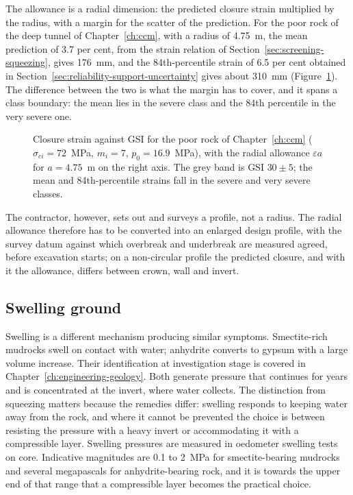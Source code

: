 The allowance is a radial dimension: the predicted closure strain multiplied
by the radius, with a margin for the scatter of the prediction. For the poor
rock of the deep tunnel of Chapter~\ref{ch:ccm}, with a radius of 4.75~m,
the mean prediction of 3.7 per cent, from the strain relation of
Section~\ref{sec:screening-squeezing}, gives 176~mm, and the 84th-percentile
strain of 6.5 per cent obtained in
Section~\ref{sec:reliability-support-uncertainty} gives about 310~mm
(Figure~\ref{fig:squeezing-allowance}). The
difference between the two is what the margin has to cover,
and it spans a class boundary: the mean lies in the severe class and the
84th percentile in the very severe one.

\begin{figure}[htbp]
\centering
{}
\caption{Closure strain against GSI for the poor rock of Chapter~\ref{ch:ccm} ($\sigma_{ci} = 72$~MPa, $m_i = 7$, $p_0 = 16.9$~MPa), with the radial allowance $\varepsilon a$ for $a = 4.75$~m on the right axis. The grey band is GSI $30 \pm 5$; the mean and 84th-percentile strains fall in the severe and very severe classes.}
\label{fig:squeezing-allowance}
\end{figure}

The contractor, however, sets out and surveys a profile, not a radius. The
radial allowance therefore has to be converted into an enlarged design
profile, with the survey datum against which overbreak and underbreak are
measured agreed, before excavation starts; on a non-circular profile the
predicted closure, and with it the allowance, differs between crown, wall
and invert.

\subsection{Swelling ground}
\label{sec:swelling-ground}

Swelling is a different mechanism producing similar symptoms. Smectite-rich
mudrocks swell on contact with water; anhydrite converts to gypsum with a
large volume increase. Their identification at investigation stage is
covered in Chapter~\ref{ch:engineering-geology}. Both generate pressure that continues for years and is
concentrated at the invert, where water collects. The distinction from
squeezing matters because the remedies differ: swelling responds to keeping
water away from the rock, and where it cannot be prevented the choice is
between resisting the pressure with a heavy invert or accommodating it with a
compressible layer. Swelling pressures are measured in oedometer swelling
tests on core. Indicative magnitudes are 0.1 to 2~MPa for smectite-bearing
mudrocks and several megapascals for anhydrite-bearing rock, and it is
towards the upper end of that range that a compressible layer becomes the
practical choice.

